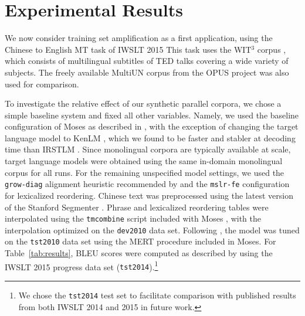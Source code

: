 









\section{Experimental Results}
\label{supersec:experimental_results}

\label{sec:experiments}
We now consider training set amplification as a first application, using the Chinese to English MT task of IWSLT 2015 
This task uses the WIT$^3$ corpus , which consists of multilingual subtitles of TED talks covering a wide variety of subjects. 
The freely available MultiUN corpus  from the OPUS project  was also used for comparison.

To investigate the relative effect of our synthetic parallel corpora, we chose a simple baseline system and fixed all other variables.
Namely, we used the baseline configuration of Moses  as described in , with the exception of changing the target language model to KenLM , which we found to be faster and stabler at decoding time than IRSTLM .
Since monolingual corpora are typically available at scale, target language models were obtained using the same in-domain monolingual corpus for all runs.
For the remaining unspecified model settings, we used the {\small \tt grow-diag} alignment heuristic recommended by  and the {\small \tt mslr-fe} configuration for lexicalized reordering. 
Chinese text was preprocessed using the latest version of the Stanford Segmenter .
Phrase and lexicalized reordering tables were interpolated using the {\small \tt tmcombine} script included with Moses , with the interpolation optimized on the {\small \tt dev2010} data set.
Following , the model was tuned on the {\small \tt tst2010} data set using the MERT procedure included in Moses.
For Table~\ref{tab:results}, BLEU scores were computed as described by  using the IWSLT 2015 progress data set ({\small \tt tst2014}).\footnote{
    We chose the {\small \tt tst2014} test set to facilitate comparison with published results from both IWSLT 2014 and 2015 in future work.
} %

